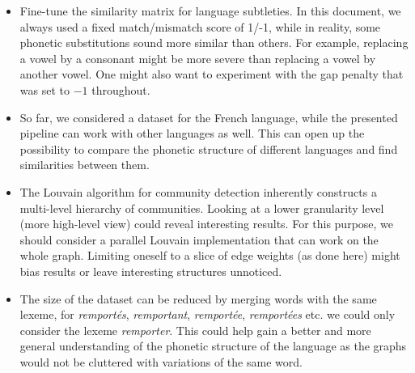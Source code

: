 \begin{itemize}
    \item Fine-tune the similarity matrix for language subtleties. In this document, we always used a fixed match/mismatch score of 1/-1, while in reality, some phonetic substitutions sound more similar than others. For example, replacing a vowel by a consonant might be more severe than replacing a vowel by another vowel. One might also want to experiment with the gap penalty that was set to $-1$ throughout.
    
    \item So far, we considered a dataset for the French language, while the presented pipeline can work with other languages as well. This can open up the possibility to compare the phonetic structure of different languages and find similarities between them.
    
    \item The Louvain algorithm \cite{louvain} for community detection inherently constructs a multi-level hierarchy of communities. Looking at a lower granularity level (more high-level view) could reveal interesting results. For this purpose, we should consider a parallel Louvain implementation that can work on the whole graph. Limiting oneself to a slice of edge weights (as done here) might bias results or leave interesting structures unnoticed.
    
    \item The size of the dataset can be reduced by merging words with the same lexeme, \eg for \textit{remportés}, \textit{remportant}, \textit{remportée}, \textit{remportées} etc. we could only consider the lexeme \textit{remporter}. This could help gain a better and more general understanding of the phonetic structure of the language as the graphs would not be cluttered with variations of the same word.
\end{itemize}
